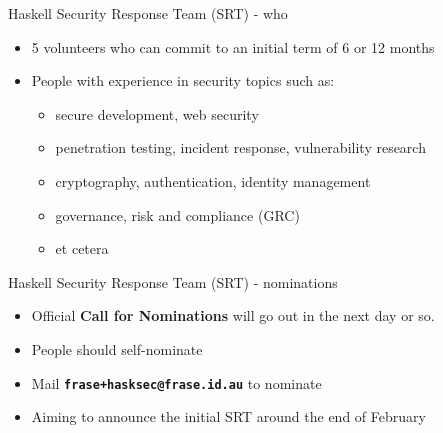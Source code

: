\documentclass[ignorenonframetext,aspectratio=169,12pt]{beamer}
\begin{document}
\begin{frame}{Haskell Security Response Team (SRT) - who}

\begin{itemize}
    \item 5 volunteers who can commit to an initial term of 6 or
        12 months
    \item People with experience in security topics such as:
        \begin{itemize}
            \item secure development, web security
            \item penetration testing, incident response,
                vulnerability research
            \item cryptography, authentication, identity management
            \item governance, risk and compliance (GRC)
            \item et cetera
        \end{itemize}
\end{itemize}

\end{frame}

\begin{frame}{Haskell Security Response Team (SRT) - nominations}

\begin{itemize}
    \item Official {\bf Call for Nominations} will go out in the
        next day or so.
    \item People should self-nominate
    \item Mail \textbf{\texttt{frase+hasksec@frase.id.au}} to nominate
    \item Aiming to announce the initial SRT around the end of February
\end{itemize}

\end{frame}
\end{document}
